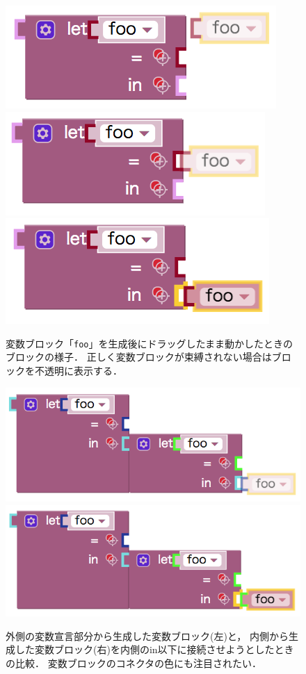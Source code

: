 \begin{figure}[h]
 \includegraphics[keepaspectratio, scale=0.3]{img/refBlock0.png}
 \includegraphics[keepaspectratio, scale=0.3]{img/refBlock1.png}
 \includegraphics[keepaspectratio, scale=0.3]{img/refBlock2.png}
 \caption{変数ブロック「{\tt foo}」を生成後にドラッグしたまま動かしたときのブロックの様子．
正しく変数ブロックが束縛されない場合はブロックを不透明に表示する．\label{fig:refBlockFoo}}

 \includegraphics[keepaspectratio, scale=0.3]{img/dupFoo0.png}
 \includegraphics[keepaspectratio, scale=0.3]{img/dupFoo1.png}
 \caption{外側の変数宣言部分から生成した変数ブロック(左)と，
内側から生成した変数ブロック(右)を内側のin以下に接続させようとしたときの比較．
変数ブロックのコネクタの色にも注目されたい．\label{fig:dupFoo}}


\end{figure}
